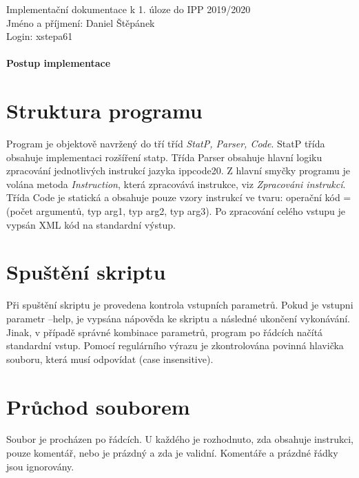 \documentclass[a4paper, 10pt]{article}
\begin{document}
\hspace{-5mm}Implementační dokumentace k 1. úloze do IPP 2019/2020\\
Jméno a příjmení: Daniel Štěpánek\\
Login: xstepa61\\
\\
\textbf{\Large{Postup implementace}}

\section{Struktura programu}
\qquad Program je objektově navržený do tří tříd \emph{StatP, Parser, Code}. StatP třída obsahuje implementaci rozšíření statp. Třída Parser obsahuje hlavní logiku zpracování jednotlivých instrukcí jazyka ippcode20. Z hlavní smyčky programu je volána metoda \emph{Instruction}, která zpracovává instrukce, viz \emph{Zpracováni instrukcí}. Třída Code je statická a obsahuje pouze vzory instrukcí ve tvaru: operační kód = (počet argumentů, typ arg1, typ arg2, typ arg3). Po zpracování celého vstupu je vypsán XML kód na standardní výstup.

\section{Spuštění skriptu}
\qquad Při spuštění skriptu je provedena kontrola vstupních parametrů. Pokud je vstupni parametr  --help, je vypsána nápověda ke skriptu a následné ukončení vykonávání. Jinak, v případě správné kombinace parametrů, program po řádcích načítá standardní vstup. Pomocí regulárního výrazu je zkontrolována povinná hlavička souboru, která musí odpovídat  (case insensitive).
	
\section{Průchod souborem}
\qquad Soubor je procházen po řádcích. U každého je rozhodnuto, zda obsahuje instrukci, pouze komentář, nebo je prázdný a zda je validní. Komentáře a prázdné řádky jsou ignorovány.
\end{document}
